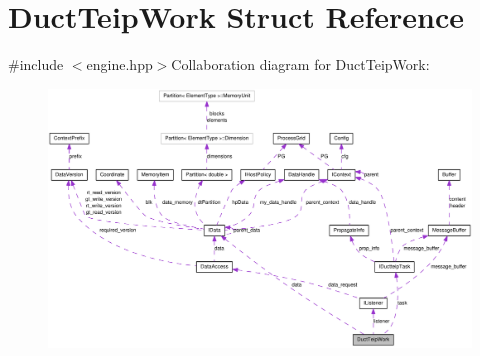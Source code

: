 \hypertarget{struct_duct_teip_work}{
\section{DuctTeipWork Struct Reference}
\label{struct_duct_teip_work}
}


{\ttfamily \#include $<$engine.hpp$>$}Collaboration diagram for DuctTeipWork:\nopagebreak
\begin{figure}[H]
\begin{center}
\leavevmode
\includegraphics[width=400pt]{struct_duct_teip_work__coll__graph}
\end{center}
\end{figure}
